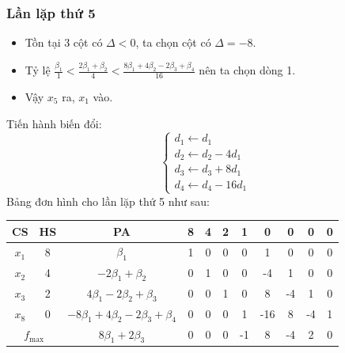 \documentclass[12pt]{article}
\begin{document}
\subsubsection{Lần lặp thứ 5}
\begin{itemize}
\item Tồn tại 3 cột có $\Delta < 0$, ta chọn cột có $\Delta = -8$.
\item Tỷ lệ $\displaystyle \frac{\beta_1}{1} < \frac{2\beta_1 + \beta_2}{4} < \frac{8\beta_1 + 4\beta_2 - 2\beta_3 + \beta_4}{16}$ nên ta chọn dòng 1.
\item Vậy $x_5$ ra, $x_1$ vào.
\end{itemize}
Tiến hành biến đổi:
$$
\left\{
\begin{array}{lll}
d_1 \leftarrow d_1 \\
d_2 \leftarrow d_2 - 4d_1 \\
d_3 \leftarrow d_3 + 8d_1\\
d_4 \leftarrow d_4 - 16d_1
\end{array}
\right.
$$
Bảng đơn hình cho lần lặp thứ 5 như sau:
\begin{table}[H]
\centering
\begin{tabular}{|c|c|c|c|c|c|c|c|c|c|c|}
\hline
CS & HS & PA & 8 & 4 & 2 & 1 & 0 & 0 & 0 & 0 \\
\hline
$x_1$ & 8 & $\beta_1$ & 1 & 0 & 0 & 0 & 1 & 0 & 0 & 0 \\
$x_2$ & 4 & $-2\beta_1 + \beta_2$ & 0 & 1 & 0 & 0 & -4 & 1 & 0 & 0 \\
$x_3$ & 2 & $4\beta_1 - 2\beta_2 + \beta_3$ & 0 & 0 & 1 & 0 & 8 & -4 & 1 & 0 \\
$x_8$ & 0 & $-8\beta_1 + 4\beta_2 - 2\beta_3 + \beta_4$ & 0 & 0 & 0 & 1 & -16 & 8 & -4 & 1 \\
\hline
\multicolumn{2}{|c|}{$f_{\max}$}
& $8\beta_1 + 2\beta_3$ & 0 & 0 & 0 & -1 & 8 & -4 & 2 & 0 \\
\hline
\end{tabular}
\end{table}
\end{document}

